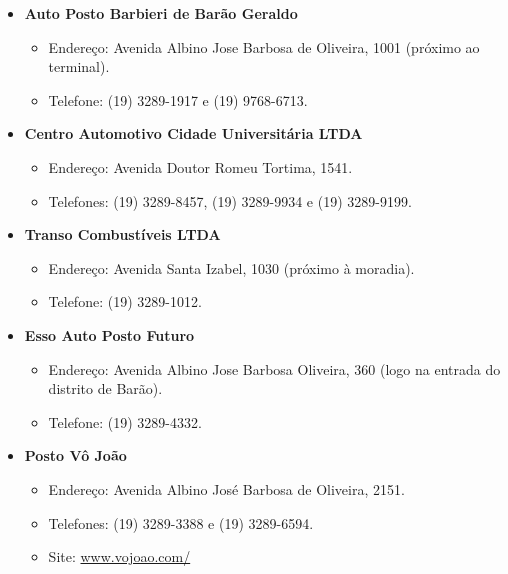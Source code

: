 \begin{itemize}
\item  \textbf{Auto Posto Barbieri de Barão Geraldo}
\begin{itemize}
\item  Endereço: Avenida Albino Jose Barbosa de Oliveira, 1001 (próximo ao terminal).
\item  Telefone: (19) 3289-1917 e (19) 9768-6713.
\end{itemize}
\end{itemize}

\begin{itemize}
\item  \textbf{Centro Automotivo Cidade Universitária LTDA}
\begin{itemize}
\item  Endereço: Avenida Doutor Romeu Tortima, 1541.
\item  Telefones: (19) 3289-8457, (19) 3289-9934 e (19) 3289-9199.
\end{itemize}
\end{itemize}

\begin{itemize}
\item  \textbf{Transo Combustíveis LTDA}
\begin{itemize}
\item  Endereço: Avenida Santa Izabel, 1030 (próximo à moradia).
\item  Telefone: (19) 3289-1012.
\end{itemize}
\end{itemize}

\begin{itemize}
\item  \textbf{Esso Auto Posto Futuro}
\begin{itemize}
\item  Endereço: Avenida Albino Jose Barbosa Oliveira, 360 (logo na entrada do distrito de Barão).
\item  Telefone: (19) 3289-4332.
\end{itemize}
\end{itemize}

\begin{itemize}
\item  \textbf{Posto Vô João}
\begin{itemize}
\item  Endereço: Avenida Albino José Barbosa de Oliveira, 2151.
\item  Telefones: (19) 3289-3388 e (19) 3289-6594.
\item  Site: \url{www.vojoao.com/}
\end{itemize}
\end{itemize}

